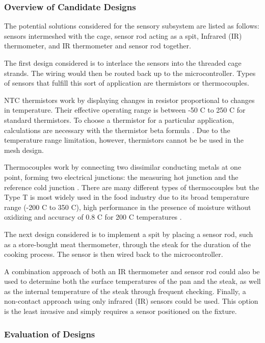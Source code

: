 \documentclass[11pt]{article}
\begin{document}
\subsubsection{Overview of Candidate Designs}

The potential solutions considered for the sensory subsystem are listed as follows: sensors intermeshed with the cage, sensor rod acting as a spit, Infrared (IR) thermometer, and IR thermometer and sensor rod together.

The first design considered is to interlace the sensors into the threaded cage strands.
The wiring would then be routed back up to the microcontroller.
Types of sensors that fulfill this sort of application are thermistors or thermocouples.

NTC thermistors work by displaying changes in resistor proportional to changes in temperature.
Their effective operating range is between -50 \degree C to 250 \degree C for standard thermistors.
To choose a thermistor for a particular application, calculations are necessary with the thermistor beta formula \cite{se1}.
Due to the temperature range limitation, however, thermistors cannot be be used in the mesh design.

Thermocouples work by connecting two dissimilar conducting metals at one point, forming two electrical junctions: the measuring hot junction and the reference cold junction \cite{se1}.
There are many different types of thermocouples but the Type T is most widely used in the food industry due to its broad temperature range (-200 C to 350 C), high performance in the presence of moisture without oxidizing and accuracy of 0.8 C for 200 C temperatures \cite{se2} \cite{se3}.

The next design considered is to implement a spit by placing a sensor rod, such as a store-bought meat thermometer, through the steak for the duration of the cooking process.
The sensor is then wired back to the microcontroller.

A combination approach of both an IR thermometer and sensor rod could also be used to determine both the surface temperatures of the pan and the steak, as well as the internal temperature of the steak through frequent checking.
Finally, a non-contact approach using only infrared (IR) sensors could be used.
This option is the least invasive and simply requires a sensor positioned on the fixture.

\subsubsection{Evaluation of Designs}
\end{document}

